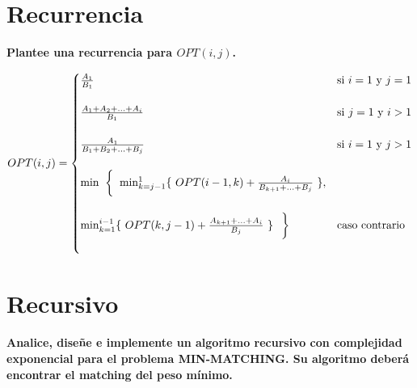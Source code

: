 \documentclass[12pt,a4,paper]{article}
\begin{document}
\newpage

\section{Recurrencia}

\textbf{Plantee una recurrencia para $OPT(i, j)$.}

\begin{equation*}
    OPT(i, j) =
    \begin{cases}
        \frac{A_1}{B_1} & \text{si } i = 1 \text{ y } j = 1\\\\
        \frac{A_1+A_2+\ldots+A_i}{B_1} & \text{si } j = 1 \text{ y } i > 1\\\\
        \frac{A_1}{B_1+B_2+\ldots+B_j} & \text{si } i = 1 \text{ y } j > 1\\\\
        \min\textbf{ \bigg\{ } \newline \min_{k=j-1}^{1}\{\text{ } OPT(i-1,k) + \frac{A_i}{B_{k+1}+\ldots+B_j} \text{ }\}, \\\\ \min_{k=1}^{i-1}\{\text{ } OPT(k,j-1) + \frac{A_{k+1}+\ldots +A_{i}}{B_j} \text{ }\} \text{ } \textbf{ \bigg\} } & \text{caso contrario}\\\\
    \end{cases}
\end{equation*}

\newpage

\section{Recursivo}

\textbf{Analice, diseñe e implemente un algoritmo recursivo con complejidad exponencial para el problema \textsc{MIN-MATCHING}. Su algoritmo deberá encontrar el matching del peso mínimo.}\\
\end{document}
